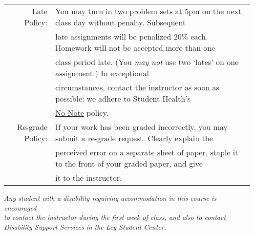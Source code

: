 \documentclass[10pt]{article}
\begin{document}
\begin{tabular}{rl}
Late Policy:		& You may turn in two problem sets at 5pm on the next class day without penalty. Subsequent\\
     				& late assignments will be penalized 20\% each.  Homework will not be accepted more than one\\
				& class period late.  (You \textit{may not} use two `lates' on one assignment.) In exceptional \\
				& circumstances, contact the instructor as soon as possible:  we adhere to Student Health's \\
				& \href{http://health.rice.edu/Content.aspx?id=98}{No Note} policy.\\[1.25em] 
				
Re-grade Policy: 	& If your work has been graded incorrectly, you may submit a re-grade request. Clearly explain the\\
				& perceived error on a separate sheet of paper, staple it to the front of your graded paper, and give\\
				& it to the instructor. \\[1em]

\hline
\end{tabular}
\vspace{-1.5em}
\begin{center}
\em Any student with a disability requiring accommodation in this course is encouraged\\
to contact the instructor during the first week of class, and also to contact\\
 Disability Support Services in the Ley Student Center.
\end{center}
\newpage
\end{document}
